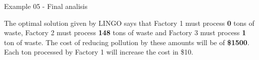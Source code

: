 \begin{frame}{Example 05 - Final analisis}


The optimal solution given by LINGO says that Factory 1 must process \textbf{0}
tons of waste, Factory 2 must process \textbf{148} tons of waste and Factory 3
must process \textbf{1} ton of waste.
The cost of reducing pollution by these amounts will be of \textbf{\$1500}.
Each ton processed by Factory 1 will increase the cost in \$10.

\end{frame}
